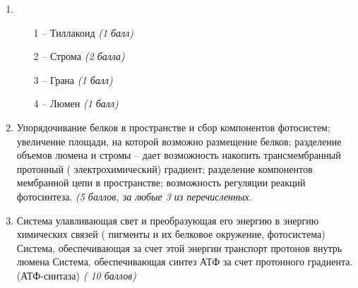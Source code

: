 \solutionSection
\begin{enumerate}
\item
\begin{enumerate}
\item [1 –] Тиллакоид \textit{(1 балл)}
\item [2 –] Строма \textit{(2 балла)}
\item [3 –] Грана \textit{(1 балл)}
\item [4 –] Люмен \textit{(1 балл)}
\end{enumerate}
\item Упорядочивание белков в пространстве и сбор компонентов фотосистем; увеличение площади, на которой возможно размещение белков;  разделение объемов люмена и стромы – дает возможность накопить трансмембранный протонный ( электрохимический) градиент; разделение  компонентов мембранной цепи в пространстве;  возможность регуляции реакций фотосинтеза. \textit{(5 баллов, за любые 3 из перечисленных.}
\item Система улавливающая свет и преобразующая его энергию в энергию химических связей ( пигменты и их белковое окружение, фотосистема)
Система, обеспечивающая за счет этой энергии транспорт протонов внутрь люмена
Система, обеспечивающая синтез АТФ за счет протонного градиента. (АТФ-синтаза) \textit{( 10 баллов)}
\end{enumerate}